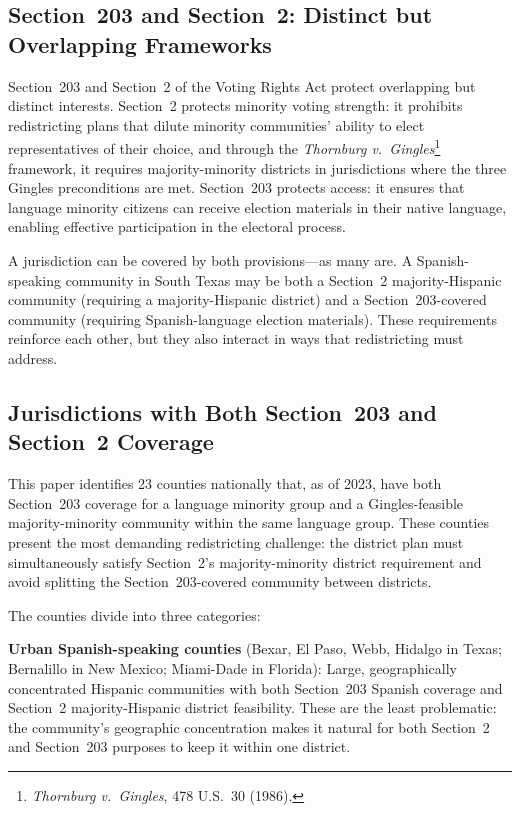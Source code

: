 \label{sec:legal}

\subsection{Section~203 and Section~2: Distinct but Overlapping Frameworks}

Section~203 and Section~2 of the Voting Rights Act protect overlapping
but distinct interests. Section~2 protects minority voting strength:
it prohibits redistricting plans that dilute minority communities'
ability to elect representatives of their choice, and through the
\textit{Thornburg v.\ Gingles}\footnote{\textit{Thornburg v.\ Gingles},
478 U.S.\ 30 (1986).} framework, it requires majority-minority districts
in jurisdictions where the three Gingles preconditions are met.
Section~203 protects access: it ensures that language minority citizens
can receive election materials in their native language, enabling effective
participation in the electoral process.

A jurisdiction can be covered by both provisions---as many are. A
Spanish-speaking community in South Texas may be both a Section~2
majority-Hispanic community (requiring a majority-Hispanic district)
and a Section~203-covered community (requiring Spanish-language
election materials). These requirements reinforce each other, but
they also interact in ways that redistricting must address.

\subsection{Jurisdictions with Both Section~203 and Section~2 Coverage}

This paper identifies 23 counties nationally that, as of 2023, have both
Section~203 coverage for a language minority group and a Gingles-feasible
majority-minority community within the same language group. These counties
present the most demanding redistricting challenge: the district plan must
simultaneously satisfy Section~2's majority-minority district requirement
and avoid splitting the Section~203-covered community between districts.

The counties divide into three categories:

\textbf{Urban Spanish-speaking counties} (Bexar, El Paso, Webb, Hidalgo
in Texas; Bernalillo in New Mexico; Miami-Dade in Florida): Large,
geographically concentrated Hispanic communities with both Section~203
Spanish coverage and Section~2 majority-Hispanic district feasibility.
These are the least problematic: the community's geographic concentration
makes it natural for both Section~2 and Section~203 purposes to keep it
within one district.

